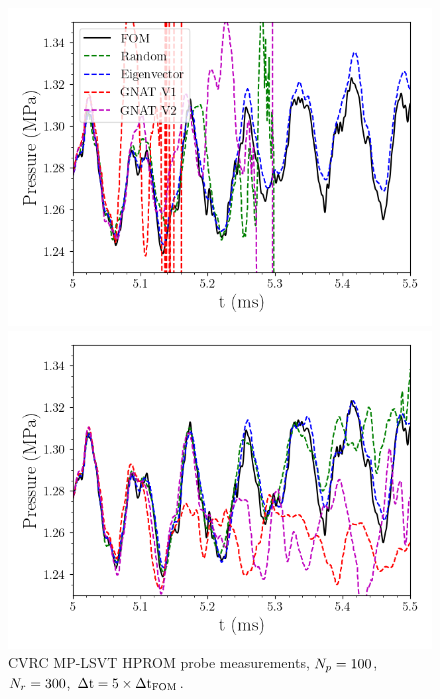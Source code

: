 \begin{figure}
	\begin{minipage}{0.49\linewidth}
		\includegraphics[width=0.99\linewidth]{Chapters/HPROMResults/Images/cvrc/deim/pressure_probe_deim_dt5e-7_samp0p00075.png}
	\end{minipage}
	\begin{minipage}{0.49\linewidth}
		\includegraphics[width=0.99\linewidth]{Chapters/HPROMResults/Images/cvrc/deim/pressure_probe_deim_dt5e-7_samp0p0025.png}
	\end{minipage}
	\caption{\label{fig:cvrcSampledROMProbes}CVRC MP-LSVT HPROM probe measurements, $N_p = 100$, $N_r = 300$, $\Delta \text{t} = 5 \times \Delta \text{t}_{\text{FOM}}$.}
\end{figure}

